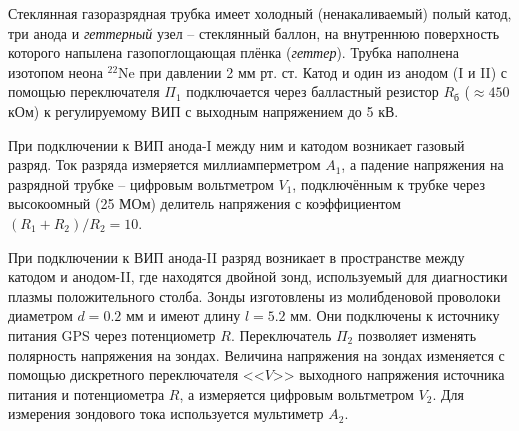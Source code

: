 \documentclass[a4paper, 12pt]{article}
\begin{document}
        Стеклянная газоразрядная трубка имеет холодный (ненакаливаемый) полый катод, три анода и \textit{геттерный} узел -- стеклянный баллон, на внутреннюю поверхность которого напылена газопоглощающая плёнка (\textit{геттер}). Трубка наполнена изотопом неона $^22$Ne при давлении 2 мм рт. ст. Катод и один из анодом (I и II) с помощью переключателя $\Pi_1$ подключается через балластный резистор $R_\text{б}$ ($\approx 450$ кОм) к регулируемому ВИП с выходным напряжением до 5 кВ.

        При подключении к ВИП анода-I между ним и катодом возникает газовый разряд. Ток разряда измеряется миллиамперметром $A_1$, а падение напряжения на разрядной трубке -- цифровым вольтметром $V_1$, подключённым к трубке через высокоомный (25 МОм) делитель напряжения с коэффициентом $(R_1+R_2)/R_2 = 10$.

        При подключении к ВИП анода-II разряд возникает в пространстве между катодом и анодом-II, где находятся двойной зонд, используемый для диагностики плазмы положительного столба. Зонды изготовлены из молибденовой проволоки диаметром $d = 0.2$ мм и имеют длину $l = 5.2$ мм. Они подключены к источнику питания GPS через потенциометр $R$. Переключатель $\Pi_2$ позволяет изменять полярность напряжения на зондах. Величина напряжения на зондах изменяется с помощью дискретного переключателя <<$V$>> выходного напряжения источника питания и потенциометра $R$, а измеряется цифровым вольтметром $V_2$. Для измерения зондового тока используется мультиметр $A_2$.
\end{document}
